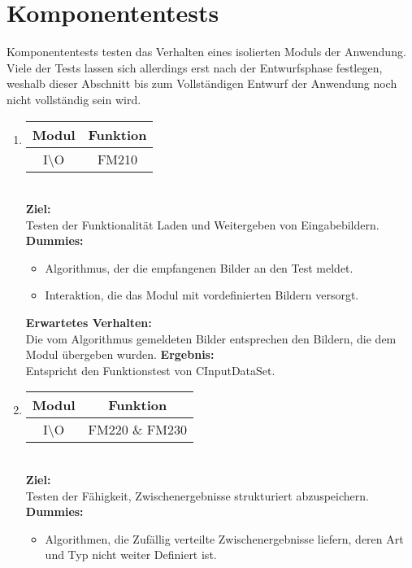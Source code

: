 \section{Komponententests}
Komponententests testen das Verhalten eines isolierten Moduls der Anwendung. Viele der Tests lassen sich allerdings erst nach der Entwurfsphase festlegen, weshalb dieser Abschnitt bis zum Vollständigen Entwurf der Anwendung noch nicht vollständig sein wird.
\\
	\begin{enumerate}[align=left, leftmargin=4em, label={\textbf{\textbackslash T2.\arabic*\textbackslash}} ]
		\item \begin{tabular}{|c|c|}
			\hline Modul & Funktion \\ 
			\hline I\textbackslash O & FM210 \\ 
			\hline 
		\end{tabular}\\ 
		\subitem \textbf{Ziel:}\\ Testen der Funktionalität Laden und Weitergeben von Eingabebildern.
		\subitem \textbf{Dummies:} \begin{itemize}
			\item Algorithmus, der die empfangenen Bilder an den Test meldet.
			\item Interaktion, die das Modul mit vordefinierten Bildern versorgt.
		\end{itemize}
		\subitem \textbf{Erwartetes Verhalten:}\\
		Die vom Algorithmus gemeldeten Bilder entsprechen den Bildern, die dem Modul übergeben wurden.
		\subitem \textbf{Ergebnis:}\\
		Entspricht den Funktionstest von CInputDataSet.
		\\\item \begin{tabular}{|c|c|}
			\hline Modul & Funktion \\
			\hline I\textbackslash O & FM220 \& FM230 \\
			\hline
		\end{tabular}\\
		\subitem \textbf{Ziel:}\\ Testen der Fähigkeit, Zwischenergebnisse strukturiert abzuspeichern.
		\subitem \textbf{Dummies:} \begin{itemize}
			\item Algorithmen, die Zufällig verteilte Zwischenergebnisse liefern, deren Art und Typ nicht weiter Definiert ist.

\end{itemize}
\end{enumerate}
